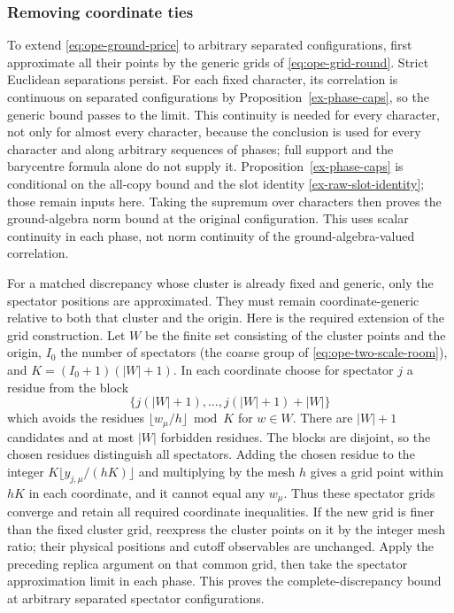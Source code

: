 \subsubsection{Removing coordinate ties}
To extend \eqref{eq:ope-ground-price} to arbitrary separated
configurations, first approximate all their points by the generic grids
of \eqref{eq:ope-grid-round}. Strict Euclidean separations persist.
For each fixed character, its correlation is continuous on separated
configurations by Proposition~\ref{ex-phase-caps}, so the generic bound
passes to the limit. This continuity is needed for every character, not
only for almost every character, because the conclusion is used for
every character and along arbitrary sequences of phases; full support and
the barycentre formula alone do not supply it. Proposition~\ref{ex-phase-caps}
is conditional on the all-copy bound and the slot identity
\eqref{ex-raw-slot-identity}; those remain inputs here. Taking the
supremum over characters then proves the ground-algebra norm bound at
the original configuration. This uses scalar continuity in each phase,
not norm continuity of the ground-algebra-valued correlation.

For a matched discrepancy whose cluster is already fixed and generic,
only the spectator positions are approximated. They must remain
coordinate-generic relative to both that cluster and the origin. Here is
the required extension of the grid construction. Let $W$ be the finite
set consisting of the cluster points and the origin, $I_0$ the number of
spectators (the coarse group of \eqref{eq:ope-two-scale-room}), and
$K=(I_0+1)(|W|+1)$. In each coordinate choose for spectator
$j$ a residue from the block
\[
 \{j(|W|+1),\ldots,j(|W|+1)+|W|\}
\]
which avoids the residues $\lfloor w_\mu/h\rfloor\bmod K$ for $w\in W$.
There are $|W|+1$ candidates and at most $|W|$ forbidden residues. The
blocks are disjoint, so the chosen residues distinguish all spectators.
Adding the chosen residue to the integer
$K\lfloor y_{j,\mu}/(hK)\rfloor$ and multiplying by the mesh $h$ gives
a grid point within $hK$ in each coordinate, and it cannot equal any $w_\mu$. Thus these spectator
grids converge and retain all required coordinate inequalities. If the
new grid is finer than the fixed cluster grid, reexpress the cluster
points on it by the integer mesh ratio; their physical positions and
cutoff observables are unchanged. Apply the preceding replica argument
on that common grid, then take the spectator approximation limit in
each phase. This proves the complete-discrepancy bound at arbitrary
separated spectator configurations.

